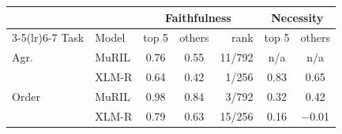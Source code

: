 \begin{tabular}{@{}llccrcc@{}}
\toprule
 & & \multicolumn{3}{c}{Faithfulness} & \multicolumn{2}{c}{Necessity} \\
\cmidrule(lr){3-5}\cmidrule(lr){6-7}
Task & Model & top 5 & others & rank & top 5 & others \\
\midrule
Agr. & MuRIL & 0.76 & 0.55 & 11/792 & n/a & n/a \\
 & XLM-R & 0.64 & 0.42 & 1/256 & 0.83 & 0.65 \\
Order & MuRIL & 0.98 & 0.84 & 3/792 & 0.32 & 0.42 \\
 & XLM-R & 0.79 & 0.63 & 15/256 & 0.16 & $-$0.01 \\
\bottomrule
\end{tabular}
